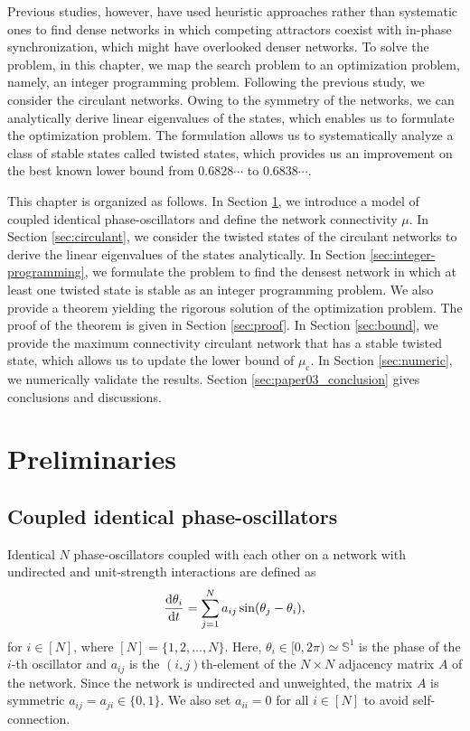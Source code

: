 Previous studies, however, have used heuristic approaches rather than systematic ones to find dense networks in which competing attractors coexist with in-phase synchronization, which might have overlooked denser networks. To solve the problem, in this chapter, we map the search problem to an optimization problem, namely, an integer programming problem. Following the previous study\cite{townsend2020}, we consider the circulant networks. Owing to the symmetry of the networks, we can analytically derive linear eigenvalues of the states, which enables us to formulate the optimization problem. The formulation allows us to systematically analyze a class of stable states called twisted states, which provides us an improvement on the best known lower bound from $0.6828\cdots$ to $0.6838\cdots$.

This chapter is organized as follows. In Section \ref{sec:preliminary}, we introduce a model of coupled identical phase-oscillators and define the network connectivity $\mu$. In Section \ref{sec:circulant}, we consider the twisted states of the circulant networks to derive the linear eigenvalues of the states analytically. In Section \ref{sec:integer-programming}, we formulate the problem to find the densest network in which at least one twisted state is stable as an integer programming problem. We also provide a theorem yielding the rigorous solution of the optimization problem. The proof of the theorem is given in Section \ref{sec:proof}. In Section \ref{sec:bound}, we provide the maximum connectivity circulant network that has a stable twisted state, which allows us to update the lower bound of $\mu_{\mathrm{c}}$. In Section \ref{sec:numeric}, we numerically validate the results. Section \ref{sec:paper03_conclusion} gives conclusions and discussions.

\section{Preliminaries}
\label{sec:preliminary}
\subsection{Coupled identical phase-oscillators}
Identical $N$ phase-oscillators coupled with each other on a network with undirected and unit-strength interactions are defined as
\begin{align}
    \frac{\mathrm{d}\theta_{i}}{\mathrm{d} t} = \sum_{j=1}^{N}a_{ij}\sin(\theta_{j}-\theta_{i}),
    \label{eq:model}
\end{align}
for $i\in[N]$, where $[N] = \{1,2,\dots,N\}$.
Here, $\theta_{i}\in[0,2\pi)\simeq\mathbb{S}^{1}$ is the phase of the $i$-th oscillator and $a_{ij}$ is the $(i,j)$th-element of the $N\times N$ adjacency matrix  $A$ of the network. Since the network is undirected and unweighted, the matrix $A$ is symmetric $a_{ij}=a_{ji}\in\{0,1\}$. We also set $a_{ii} = 0$ for all $i\in[N]$ to avoid self-connection.

